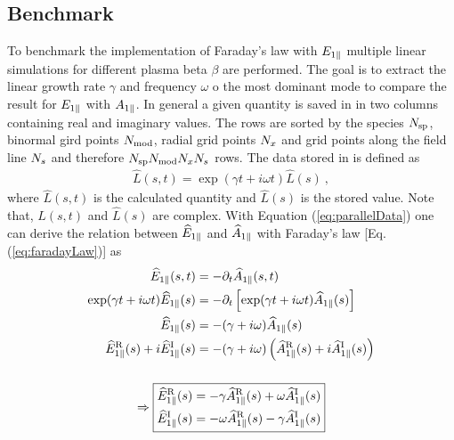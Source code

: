 \newpage

\subsection{Benchmark}
\label{sub:benchmarkFieldEpar}

To benchmark the implementation of Faraday's law with $E_{1\parallel}$ multiple linear simulations for different plasma beta $\beta$ are performed. The goal is to extract the linear growth rate $\gamma$ and frequency $\omega$ o the most dominant mode to compare the result for $E_{1\parallel}$ with $A_{1\parallel}$. In general a given quantity is saved in  in two columns containing real and imaginary values. The rows are sorted by the species $N_\mathrm{sp}$, binormal gird points $N_\mathrm{mod}$, radial grid points $N_x$ and grid points along the field line $N_s$ and therefore $N_\mathrm{sp}N_\mathrm{mod}N_xN_s$ rows. The data stored in  is defined as
\begin{gather}
    \widehat{L}(s,t) = \exp (\gamma t + i\omega t) \widehat{L}(s)~,
    \label{eq:parallelData}
\end{gather}
where $\widehat{L}(s,t)$ is the calculated quantity and $\widehat{L}(s)$ is the stored value. \cite{GKWManual} Note that, $\widehat{L}(s,t)$ and $\widehat{L}(s)$ are complex. With Equation (\ref{eq:parallelData}) one can derive the relation between $\widehat{E}_{1\parallel}$ and $\widehat{A}_{1\parallel}$ with Faraday's law [Eq. (\ref{eq:faradayLaw})] as
\begin{gather}
    \begin{aligned}
        \widehat{E}_{1\parallel}(s,t) &= - \partial_t \widehat{A}_{1\parallel}(s,t) \\
        \exp (\gamma t + i\omega t) \widehat{E}_{1\parallel}(s) &= - \partial_t \left[\exp(\gamma t + i\omega t) \widehat{A}_{1\parallel}(s)\right] \\
        \widehat{E}_{1\parallel}(s) &= - (\gamma + i\omega) \widehat{A}_{1\parallel}(s) \\
        \widehat{E}_{1\parallel}^\mathrm{R}(s) + i \widehat{E}_{1\parallel}^\mathrm{I}(s) &= - (\gamma + i\omega) \left(\widehat{A}_{1\parallel}^\mathrm{R}(s) + i \widehat{A}_{1\parallel}^\mathrm{I}(s)\right)
    \end{aligned} \\[0.5cm] 
    \Rightarrow \boxed{
    \begin{aligned}
        \widehat{E}_{1\parallel}^\mathrm{R}(s) &= - \gamma \widehat{A}_{1\parallel}^\mathrm{R}(s) + \omega \widehat{A}_{1\parallel}^\mathrm{I}(s) \\ 
        \widehat{E}_{1\parallel}^\mathrm{I}(s) &= - \omega \widehat{A}_{1\parallel}^\mathrm{R}(s) - \gamma \widehat{A}_{1\parallel}^\mathrm{I}(s)   
    \end{aligned}
    } \nonumber
    \label{eq:parallelDataEparEqApar}
\end{gather}


